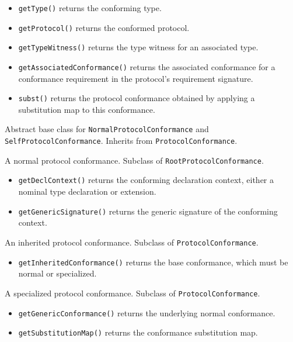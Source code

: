 \documentclass[../generics]{subfiles}
\begin{document}
\begin{itemize}
\item \texttt{getType()} returns the conforming type.
\item \texttt{getProtocol()} returns the conformed protocol.
\item \texttt{getTypeWitness()} returns the type witness for an associated type.
\item \texttt{getAssociatedConformance()} returns the associated conformance for a conformance requirement in the protocol's requirement signature.
\item \texttt{subst()} returns the protocol conformance obtained by applying a substitution map to this conformance.
\end{itemize}

Abstract base class for \texttt{NormalProtocolConformance} and \texttt{SelfProtocolConformance}. Inherits from \texttt{ProtocolConformance}.

A normal protocol conformance. Subclass of \texttt{RootProtocolConformance}.
\begin{itemize}
\item \texttt{getDeclContext()} returns the conforming declaration context, either a nominal type declaration or extension.
\item \texttt{getGenericSignature()} returns the generic signature of the conforming context.
\end{itemize}

An inherited protocol conformance. Subclass of \texttt{ProtocolConformance}.
\begin{itemize}
\item \texttt{getInheritedConformance()} returns the base conformance, which must be normal or specialized.
\end{itemize}

A specialized protocol conformance. Subclass of \texttt{ProtocolConformance}.
\begin{itemize}
\item \texttt{getGenericConformance()} returns the underlying normal conformance.
\item \texttt{getSubstitutionMap()} returns the conformance substitution map.
\end{itemize}
\end{document}
